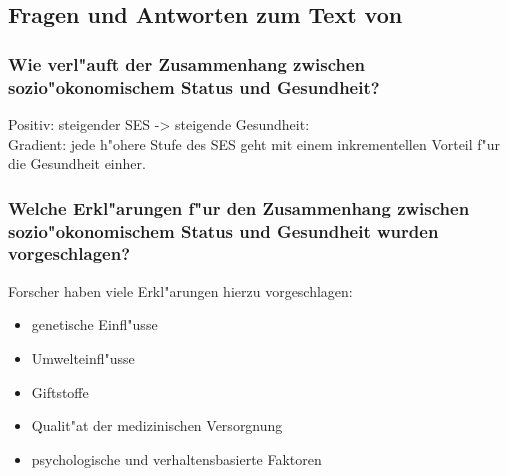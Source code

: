 \subsection{Fragen und Antworten zum Text von \textcite{chen_why_2004}}

\subsubsection{Wie verl"auft der Zusammenhang zwischen sozio"okonomischem Status und Gesundheit? }
Positiv: steigender SES -> steigende Gesundheit: \\
Gradient: jede h"ohere Stufe des SES geht mit einem inkrementellen Vorteil f"ur die Gesundheit einher.

\subsubsection{Welche Erkl"arungen f"ur den Zusammenhang zwischen sozio"okonomischem Status und Gesundheit wurden vorgeschlagen? }
Forscher haben viele Erkl"arungen hierzu vorgeschlagen:
\begin{itemize}
        \item genetische Einfl"usse
        \item Umwelteinfl"usse
        \item Giftstoffe
        \item Qualit"at der medizinischen Versorgnung
        \item psychologische und verhaltensbasierte Faktoren
\end{itemize}

